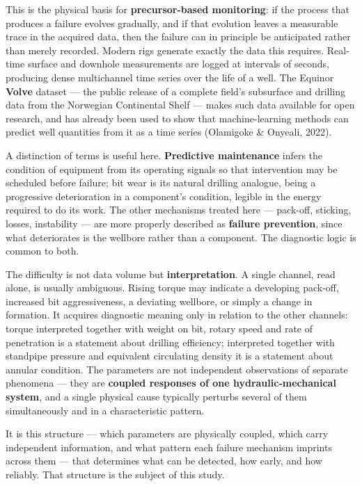 \documentclass[12pt,a4paper]{report}
\begin{document}
This is the physical basis for \textbf{precursor-based monitoring}: if the process that produces a failure
evolves gradually, and if that evolution leaves a measurable trace in the acquired data, then the failure
can in principle be anticipated rather than merely recorded. Modern rigs generate exactly the data this
requires. Real-time surface and downhole measurements are logged at intervals of seconds, producing dense
multichannel time series over the life of a well. The Equinor \textbf{Volve} dataset --- the public release of a
complete field's subsurface and drilling data from the Norwegian Continental Shelf --- makes such data
available for open research, and has already been used to show that machine-learning methods can predict
well quantities from it as a time series (Olamigoke \& Onyeali, 2022).

A distinction of terms is useful here. \textbf{Predictive maintenance} infers the condition of equipment from
its operating signals so that intervention may be scheduled before failure; bit wear is its natural
drilling analogue, being a progressive deterioration in a component's condition, legible in the energy
required to do its work. The other mechanisms treated here --- pack-off, sticking, losses, instability --- are
more properly described as \textbf{failure prevention}, since what deteriorates is the wellbore rather than a
component. The diagnostic logic is common to both.

The difficulty is not data volume but \textbf{interpretation}. A single channel, read alone, is usually
ambiguous. Rising torque may indicate a developing pack-off, increased bit aggressiveness, a deviating
wellbore, or simply a change in formation. It acquires diagnostic meaning only in relation to the other
channels: torque interpreted together with weight on bit, rotary speed and rate of penetration is a
statement about drilling efficiency; interpreted together with standpipe pressure and equivalent
circulating density it is a statement about annular condition. The parameters are not independent
observations of separate phenomena --- they are \textbf{coupled responses of one hydraulic-mechanical system},
and a single physical cause typically perturbs several of them simultaneously and in a characteristic
pattern.

It is this structure --- which parameters are physically coupled, which carry independent information, and
what pattern each failure mechanism imprints across them --- that determines what can be detected, how
early, and how reliably. That structure is the subject of this study.
\end{document}
